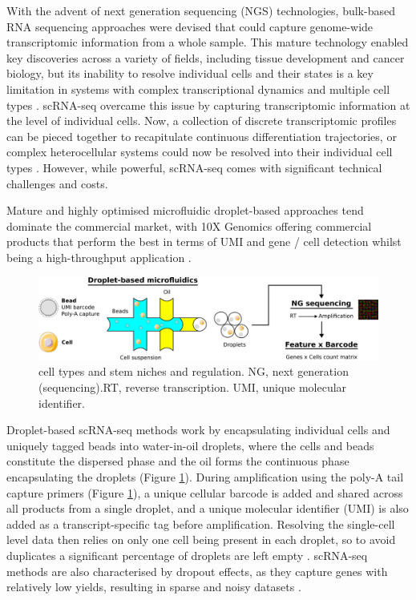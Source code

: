 With the advent of next generation sequencing (NGS) technologies, bulk-based RNA sequencing approaches were devised that could capture genome-wide transcriptomic information from a whole sample. This mature technology enabled key discoveries across a variety of fields, including tissue development and cancer biology, but its inability to resolve individual cells and their states is a key limitation in systems with complex transcriptional dynamics and multiple cell types \cite{li_bulk_2021}.
scRNA-seq overcame this issue by capturing transcriptomic information at the level of individual cells. Now, a collection of discrete transcriptomic profiles can be pieced together to recapitulate continuous differentiation trajectories, or complex heterocellular systems could now be resolved into their individual cell types \cite{haber_single-cell_2017}. However, while powerful, scRNA-seq comes with significant technical challenges and costs. 

Mature and highly optimised microfluidic droplet-based approaches tend dominate the commercial market, with 10X Genomics offering commercial products \cite{kitzman_haplotypes_2016} that perform the best in terms of UMI and gene / cell detection whilst being a high-throughput application \cite{ding_systematic_2020}.

\begin{figure}
    \centering
    \includegraphics{01intro/figs/1TECH_scRNAseq.png}
    \caption{cell types and stem niches and regulation. NG, next generation (sequencing).RT, reverse transcription. UMI, unique molecular identifier.}
    \label{fig:1tech}
\end{figure}

Droplet-based scRNA-seq methods work by encapsulating individual cells and uniquely tagged beads into water-in-oil droplets, where the cells and beads constitute the dispersed phase and the oil forms the continuous phase encapsulating the droplets \cite{macosko_highly_2015} (Figure \ref{fig:1tech}). During amplification using the poly-A tail capture primers (Figure \ref{fig:1tech}), a unique cellular barcode is added and shared across all products from a single droplet, and a unique molecular identifier (UMI) is also added as a transcript-specific tag before amplification.
Resolving the single-cell level data then relies on only one cell being present in each droplet, so to avoid duplicates a significant percentage of droplets are left empty \cite{abate_beating_2009}. scRNA-seq methods are also characterised by dropout effects, as they capture genes with relatively low yields, resulting in sparse and noisy datasets \cite{qiu_embracing_2020}. 

